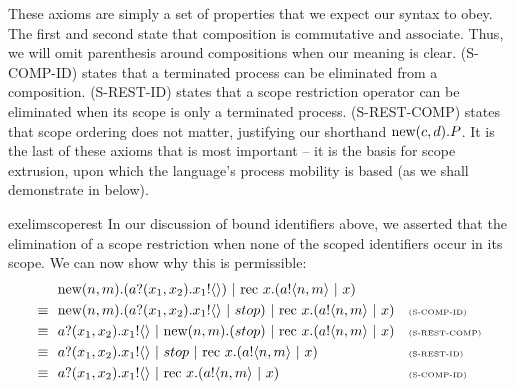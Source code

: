 	These axioms are simply a set of properties that we expect our syntax to obey.  The first and second state that composition is commutative and associate.  Thus, we will omit parenthesis around compositions when our meaning is clear.  (S-COMP-ID) states that a terminated process can be eliminated from a composition.  (S-REST-ID) states that a scope restriction operator can be eliminated when its scope is only a terminated process. (S-REST-COMP) states that scope ordering does not matter, justifying our shorthand $\text{new}({c,d}). P$.  It is the last of these axioms that is most important -- it is the basis for scope extrusion, upon which the language's process mobility is based (as we shall demonstrate in  below).
	
	\begin{example}{exelimscoperest}
		In our discussion of bound identifiers above, we asserted that the elimination of a scope restriction when none of the scoped identifiers occur in its scope. We can now show why this is permissible:
		\begin{align*}
			&\ \text{new}({n,m}).({a}?({x_1,x_2}).{x_1}!\langle{}\rangle)\ |\  \text{rec }{x}.({a}!\langle{n,m}\rangle \ |\  x) &&\\
			\equiv\ &\ \text{new}({n,m}).({a}?({x_1,x_2}).{x_1}!\langle{}\rangle \ |\  stop)\ |\  \text{rec }{x}.({a}!\langle{n,m}\rangle \ |\  x) && \text{\tiny{(S-COMP-ID)}}\\
			\equiv\ &\ {a}?({x_1,x_2}).{x_1}!\langle{}\rangle \ |\  \text{new}({n,m}).(stop)\ |\  \text{rec }{x}.({a}!\langle{n,m}\rangle \ |\  x) && \text{\tiny{(S-REST-COMP)}}\\
			\equiv\ &\ {a}?({x_1,x_2}).{x_1}!\langle{}\rangle \ |\  stop \ |\  \text{rec }{x}.({a}!\langle{n,m}\rangle \ |\  x) && \text{\tiny{(S-REST-ID)}}\\
			\equiv\ &\ {a}?({x_1,x_2}).{x_1}!\langle{}\rangle \ |\  \text{rec }{x}.({a}!\langle{n,m}\rangle \ |\  x) && \text{\tiny{(S-COMP-ID)}}
		\end{align*}
	\end{example}
